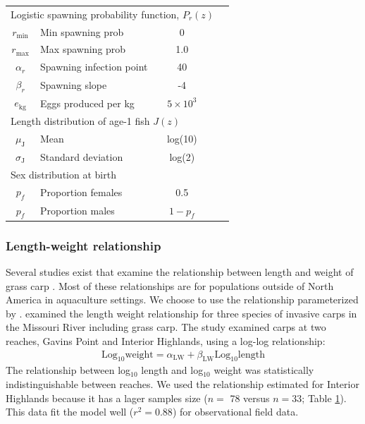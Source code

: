 \documentclass{article}[12pt]
\begin{document}
\begin{table}[htbp]
{\begin{tabular}{@{} c lc l c @{}}
\cmidrule(r){1-4}
 \multicolumn{4}{l}{Logistic spawning probability function, \(P_r(z)\)} \\
\(r_\text{min}\) & Min spawning prob & 0 & \citep{shireman1983synopsis} \\
\(r_\text{max}\) & Max spawning prob & 1.0 & \citep{shireman1983synopsis} \\
\(\alpha_r\) & Spawning infection point & 40 & \citep{shireman1983synopsis} \\
\(\beta_r\) & Spawning  slope & -4 & \ \\
 \midrule
 \(e_\text{kg}\) & Eggs produced per kg & \(5\times10^{3}\) & \citep{ashraf1998effects}\\
  \midrule
   \multicolumn{4}{l}{Length distribution of age-1 fish \(J(z)\)} \\
 \(\mu_\text{J}\) & Mean & log(10) & \citep{shireman1983synopsis} \\ 
 \(\sigma_\text{J}\) & Standard deviation & log(2) &   \\ 
   \midrule
   \multicolumn{4}{l}{Sex distribution at birth} \\
  \(p_f\) & Proportion females  & 0.5 &  \citep{shireman1983synopsis} \\ 
  \(p_f\) & Proportion males  & \(1 - p_f\) &  \\ 
      \bottomrule
   \end{tabular} }
   \label{tab:parameterValues}
\end{table}


\subsubsection{Length-weight relationship}

Several studies exist that examine the relationship between length and weight of grass carp \citep[e.g.,][]{dhanze1997biology}.
Most of these relationships are for populations outside of North America in aquaculture settings.
We choose to use the relationship parameterized by \citet{wanner2009length}.
\citet{wanner2009length} examined the length weight relationship for three species of invasive carps in the Missouri River including grass carp.
The study examined carps at two reaches, Gavins Point and Interior Highlands, using a log-log relationship:
\begin{eqnarray}
\text{Log}_{10}\text{weight} = \alpha_{\text{LW}} + \beta_{\text{LW}} \text{Log}_{10}\text{length}  \label{eqn:LW}
\end{eqnarray}
The relationship between log\(_{10}\) length and log\(_{10}\) weight was statistically indistinguishable  between reaches.
We used the relationship estimated for Interior Highlands because it has a lager samples size (\(n=\) 78 versus \(n=33\); Table \ref{tab:parameterValues}).
This data fit the model well (\(r^2 = 0.88\)) for observational field data. 
\end{document}
